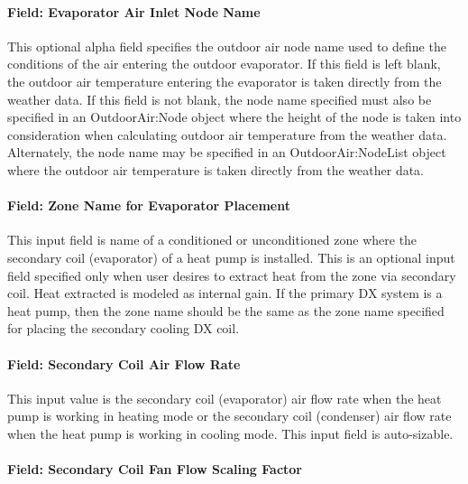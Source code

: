 \paragraph{Field: Evaporator Air Inlet Node Name}\label{field-evaporator-air-inlet-node-name}

This optional alpha field specifies the outdoor air node name used to define the conditions of the air entering the outdoor evaporator. If this field is left blank, the outdoor air temperature entering the evaporator is taken directly from the weather data. If this field is not blank, the node name specified must also be specified in an OutdoorAir:Node object where the height of the node is taken into consideration when calculating outdoor air temperature from the weather data. Alternately, the node name may be specified in an OutdoorAir:NodeList object where the outdoor air temperature is taken directly from the weather data.

\paragraph{Field: Zone Name for Evaporator Placement}\label{field-zone-name-for-evaporator-placement}

This input field is name of a conditioned or unconditioned zone where the secondary coil (evaporator) of a heat pump is installed. This is an optional input field specified only when user desires to extract heat from the zone via secondary coil. Heat extracted is modeled as internal gain. If the primary DX system is a heat pump, then the zone name should be the same as the zone name specified for placing the secondary cooling DX coil.

\paragraph{Field: Secondary Coil Air Flow Rate}\label{field-secondary-coil-air-flow-rate}

This input value is the secondary coil (evaporator) air flow rate when the heat pump is working in heating mode or the secondary coil (condenser) air flow rate when the heat pump is working in cooling mode. This input field is auto-sizable.

\paragraph{Field: Secondary Coil Fan Flow Scaling Factor}\label{field-secondary-coil-fan-flow-scaling-factor}

